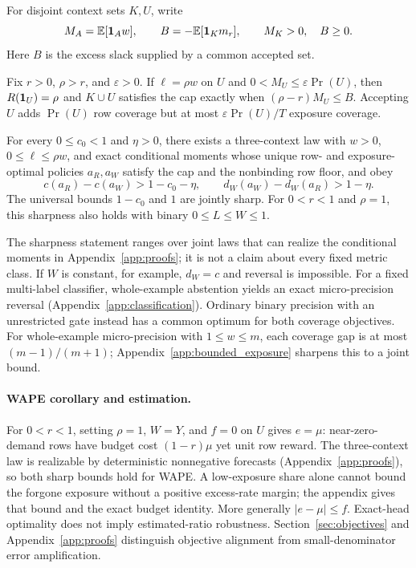 For disjoint context sets $K,U$, write
\[
 M_A=\mathbb{E}[\mathbf{1}_Aw],\qquad B=-\mathbb{E}[\mathbf{1}_Km_r],\qquad
 M_K>0,\quad B\geq0.
\]
Here $B$ is the excess slack supplied by a common accepted set.
\begin{proposition}
\label{prop:lowdemand}
Fix $r>0$, $\rho>r$, and $\varepsilon>0$. If $\ell=\rho w$ on $U$ and
$0<M_U\leq\varepsilon\Pr(U)$, then $R(\mathbf{1}_U)=\rho$ and
$K\cup U$ satisfies the cap exactly when $(\rho-r)M_U\leq B$.
Accepting $U$ adds $\Pr(U)$ row coverage but at most
$\varepsilon\Pr(U)/T$ exposure coverage.

For every $0\leq c_0<1$ and $\eta>0$, there exists a three-context
law with $w>0$, $0\leq\ell\leq\rho w$, and exact conditional moments
whose unique row- and exposure-optimal policies $a_R,a_W$ satisfy
the cap and the nonbinding row floor, and obey
\[
 c(a_R)-c(a_W)>1-c_0-\eta,\qquad
 d_W(a_W)-d_W(a_R)>1-\eta.
\]
The universal bounds $1-c_0$ and $1$ are jointly sharp. For
$0<r<1$ and $\rho=1$, this sharpness also holds with binary $0\leq L\leq W\leq1$.
\end{proposition}
The sharpness statement ranges over joint laws that can realize the
conditional moments in Appendix~\ref{app:proofs}; it is not a claim
about every fixed metric class. If $W$ is constant, for example,
$d_W=c$ and reversal is impossible. For a fixed multi-label classifier, whole-example abstention yields an exact micro-precision reversal (Appendix~\ref{app:classification}). Ordinary binary precision with an unrestricted gate instead has a common optimum for both coverage objectives. For whole-example micro-precision with $1\leq w\leq m$, each coverage gap is at most $(m-1)/(m+1)$; Appendix~\ref{app:bounded_exposure} sharpens this to a joint bound.

\paragraph{WAPE corollary and estimation.}
For $0<r<1$, setting $\rho=1$, $W=Y$, and $f=0$ on $U$ gives
$e=\mu$: near-zero-demand rows have budget cost $(1-r)\mu$ yet
unit row reward. The three-context law is realizable by deterministic
nonnegative forecasts (Appendix~\ref{app:proofs}), so both sharp bounds
hold for WAPE. A low-exposure share alone cannot bound the forgone
exposure without a positive excess-rate margin; the appendix gives
that bound and the exact budget identity. More generally $|e-\mu|\leq f$.
Exact-head optimality does not imply estimated-ratio robustness.
Section~\ref{sec:objectives} and Appendix~\ref{app:proofs} distinguish
objective alignment from small-denominator error amplification.
